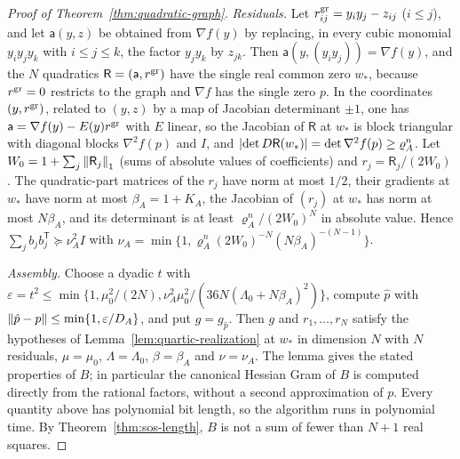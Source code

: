 \begin{proof}[Proof of Theorem~\ref{thm:quadratic-graph}]
\emph{Residuals.} Let $r^{\rm gr}_{ij}=y_iy_j-z_{ij}$ ($i\le j$), and let
$\mathsf a(y,z)$ be obtained from $\nabla f(y)$ by replacing, in every cubic
monomial $y_iy_jy_k$ with $i\le j\le k$, the factor $y_jy_k$ by $z_{jk}$. Then
$\mathsf a(y,(y_iy_j))=\nabla f(y)$, and the $N$ quadratics
$\mathsf R=(\mathsf a,r^{\rm gr})$ have the single real common zero $w_*$,
because $r^{\rm gr}=0$ restricts to the graph and $\nabla f$ has the single
zero $p$. In the coordinates $(y,r^{\rm gr})$, related to $(y,z)$ by a map of
Jacobian determinant $\pm1$, one has $\mathsf a=\nabla f(y)-E(y)r^{\rm gr}$
with $E$ linear, so the Jacobian of $\mathsf R$ at $w_*$ is block triangular
with diagonal blocks $\nabla^2f(p)$ and $I$, and
$\left\lvert\det D\mathsf R(w_*)\right\rvert=\det\nabla^2f(p)\ge\varrho_A^n$. Let
$W_0=1+\sum_j\left\lVert\mathsf R_j\right\rVert_1$ (sums of absolute values of coefficients)
and $r_j=\mathsf R_j/(2W_0)$. The quadratic-part matrices of the $r_j$ have
norm at most $1/2$, their gradients at $w_*$ have norm at most
$\beta_A=1+K_A$, the Jacobian of $(r_j)$ at $w_*$ has norm at most $N\beta_A$,
and its determinant is at least $\varrho_A^n/(2W_0)^N$ in absolute value.
Hence $\sum_jb_jb_j^{\mathsf T}\succeq\nu_A^2I$ with
$\nu_A=\min\{1,\varrho_A^n(2W_0)^{-N}(N\beta_A)^{-(N-1)}\}$.

\emph{Assembly.} Choose a dyadic $t$ with
$\varepsilon=t^2\le\min\{1,\mu_0^2/(2N),\nu_A^2\mu_0^2/(36N(\Lambda_0+N\beta_A)^2)\}$,
compute $\hat p$ with $\left\lVert\hat p-p\right\rVert\le\min\{1,\varepsilon/D_A\}$, and put
$g=g_{\hat p}$. Then $g$ and $r_1,\ldots,r_N$ satisfy the hypotheses of
Lemma~\ref{lem:quartic-realization} at $w_*$ in dimension $N$ with $N$
residuals, $\mu=\mu_0$, $\Lambda=\Lambda_0$, $\beta=\beta_A$ and $\nu=\nu_A$.
The lemma gives the stated properties of $B$; in particular the canonical
Hessian Gram of $B$ is computed directly from the rational factors, without a
second approximation of $p$. Every quantity above has polynomial bit length,
so the algorithm runs in polynomial time. By Theorem~\ref{thm:sos-length}, $B$
is not a sum of fewer than $N+1$ real squares.
\end{proof}
